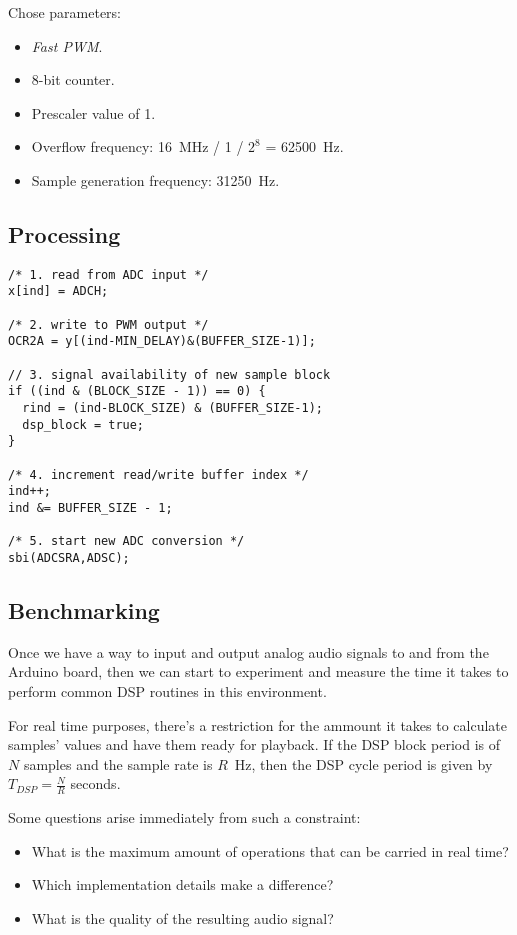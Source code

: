 Chose parameters:

\begin{itemize}
  \item \emph{Fast PWM}.
  \item 8-bit counter.
  \item Prescaler value of 1.
  \item Overflow frequency: 16~MHz / 1 / $2^8$ = 62500~Hz.
  \item Sample generation frequency: 31250~Hz.
\end{itemize}

\subsection{Processing}

\begin{lstlisting}
/* 1. read from ADC input */
x[ind] = ADCH;

/* 2. write to PWM output */
OCR2A = y[(ind-MIN_DELAY)&(BUFFER_SIZE-1)];

// 3. signal availability of new sample block
if ((ind & (BLOCK_SIZE - 1)) == 0) {
  rind = (ind-BLOCK_SIZE) & (BUFFER_SIZE-1);
  dsp_block = true;
}

/* 4. increment read/write buffer index */
ind++;
ind &= BUFFER_SIZE - 1;

/* 5. start new ADC conversion */
sbi(ADCSRA,ADSC); 
\end{lstlisting}



\subsection{Benchmarking}

Once we have a way to input and output analog audio signals to and from the
Arduino board, then we can start to experiment and measure the time it takes
to perform common DSP routines in this environment.

For real time purposes, there's a restriction for the ammount it takes to
calculate samples' values and have them ready for playback. If the DSP block
period is of $N$ samples and the sample rate is $R$~Hz, then the DSP cycle
period is given by $T_{DSP}=\frac{N}{R}$ seconds.

Some questions arise immediately from such a constraint:

\begin{itemize}
    \item What is the maximum amount of operations that can be carried in real
    time?
    \item Which implementation details make a difference?
    \item What is the quality of the resulting audio signal?
\end{itemize}

